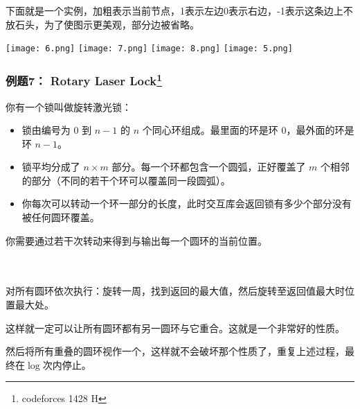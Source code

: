 \documentclass{noithesis}
\begin{document}
下面就是一个实例，加粗表示当前节点，1表示左边0表示右边，-1表示这条边上不放石头，为了使图示更美观，部分边被省略。

\texttt{[image: 6.png]}
\texttt{[image: 7.png]}
\texttt{[image: 8.png]}
\texttt{[image: 5.png]}

\subsubsection{例题7： Rotary Laser Lock\footnote{codeforces 1428 H}}

你有一个锁叫做旋转激光锁：

\begin{itemize}
	\item 锁由编号为 $0$ 到 $n-1$ 的 $n$ 个同心环组成。最里面的环是环 $0$，最外面的环是环 $n-1$。
	\item 锁平均分成了 $n\times m$ 部分。每一个环都包含一个圆弧，正好覆盖了 $m$ 个相邻的部分（不同的若干个环可以覆盖同一段圆弧）。
	\item 你每次可以转动一个环一部分的长度，此时交互库会返回锁有多少个部分没有被任何圆环覆盖。
\end{itemize}

你需要通过若干次转动来得到与输出每一个圆环的当前位置。

\paragraph{}\

对所有圆环依次执行：旋转一周，找到返回的最大值，然后旋转至返回值最大时位置最大处。

这样就一定可以让所有圆环都有另一圆环与它重合。这就是一个非常好的性质。

然后将所有重叠的圆环视作一个，这样就不会破坏那个性质了，重复上述过程，最终在$\log$次内停止。

% 
% 
% 
% 
% 
% 
% 
% 
\end{document}
